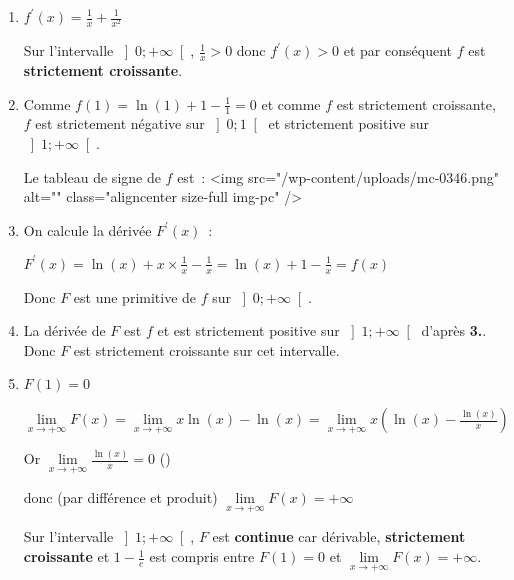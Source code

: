 \begin{corrige}
\begin{enumerate}
          $\lim\limits_{x\rightarrow +\infty } \ln\left(x\right)=+\infty   $ et $ \lim\limits_{x\rightarrow +\infty } \frac{1}{x}=0$
          \par
          Et par somme $\lim\limits_{x\rightarrow +\infty }f\left(x\right)=+\infty $
          \item
          $f^{\prime}\left(x\right)= \frac{1}{x}+\frac{1}{x^{2}}$
          \par
          Sur l'intervalle $\left]0;+\infty \right[$, $\frac{1}{x} > 0$ donc $f^{\prime}\left(x\right) > 0$ et par conséquent $f$ est \textbf{strictement croissante}.
          \item
          Comme $f\left(1\right)=\ln\left(1\right)+1-\frac{1}{1}=0$ et comme $f$ est strictement croissante, $f$ est strictement négative sur $\left]0;1\right[$ et strictement positive sur $\left]1;+\infty \right[$.
          \par
          Le tableau de signe de $f$ est :
          <img src="/wp-content/uploads/mc-0346.png" alt="" class="aligncenter size-full  img-pc" />
          \item
          On calcule la dérivée $F^{\prime}\left(x\right)$ :
          \par
          $F^{\prime}\left(x\right)=\ln\left(x\right)+x\times \frac{1}{x}-\frac{1}{x}=\ln\left(x\right)+1-\frac{1}{x}=f\left(x\right)$
          \par
          Donc $F$ est une primitive de $f$ sur $\left]0;+\infty \right[$.
          \item
          La dérivée de $F$ est $f$ et est strictement positive sur $\left]1;+\infty \right[$ d'après \textbf{3.}. Donc $F$ est strictement croissante sur cet intervalle.
          \item
          $F\left(1\right)=0$
          \par
          $\lim\limits_{x\rightarrow +\infty }F\left(x\right)=\lim\limits_{x\rightarrow +\infty }x\ln\left(x\right)-\ln\left(x\right)=\lim\limits_{x\rightarrow +\infty }x\left(\ln\left(x\right)-\frac{\ln\left(x\right)}{x}\right)$
          \par
          Or $\lim\limits_{x\rightarrow +\infty }\frac{\ln\left(x\right)}{x}=0$ ()
          \par
          donc (par différence et produit) $\lim\limits_{x\rightarrow +\infty }F\left(x\right)=+\infty $
          \par
          Sur l'intervalle $\left]1;+\infty \right[$, $F$ est \textbf{continue} car dérivable, \textbf{strictement croissante} et  $1-\frac{1}{e}$ est compris entre $F\left(1\right)=0$ et  $\lim\limits_{x\rightarrow +\infty }F\left(x\right)=+\infty $.

\end{enumerate}
\end{corrige}
